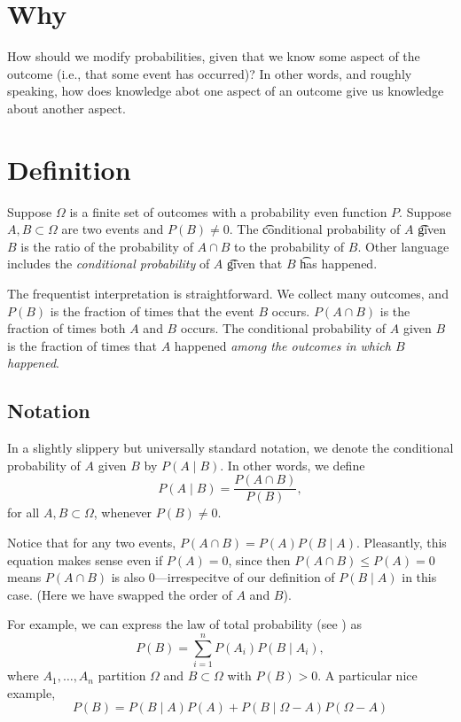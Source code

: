 
\section*{Why}

How should we modify probabilities, given that we know some aspect of the outcome (i.e., that some event has occurred)?
In other words, and roughly speaking, how does knowledge abot one aspect of an outcome give us knowledge about another aspect.

\section*{Definition}

Suppose $\Omega $ is a finite set of outcomes with a probability even function $P$.
Suppose $A, B \subset \Omega $ are two events and $P(B) \neq 0$.
The \t{conditional probability} of $A$ \t{given} $B$ is the ratio of the probability of $A \cap  B$ to the probability of $B$.
Other language includes the \textit{conditional probability} of $A$ \t{given that} $B$ \t{has happened}.

The frequentist interpretation is straightforward.
We collect many outcomes, and $P(B)$ is the fraction of times that the event $B$ occurs.
$P(A \cap  B)$ is the fraction of times both $A$ and $B$ occurs.
The conditional probability of $A$ given $B$ is the fraction of times that $A$ happened \textit{among the outcomes in which $B$ happened}.

\subsection*{Notation}

In a slightly slippery but universally standard notation, we denote the conditional probability of $A$ given $B$ by $P(A \mid  B)$.
In other words, we define
\[
P(A \mid  B) = \frac{P(A \cap  B)}{P(B)},
\]
for all $A, B \subset \Omega $, whenever $P(B) \neq 0$.

Notice that for any two events, $P(A \cap  B) = P(A) P(B\mid A)$.
Pleasantly, this equation makes sense even if $P(A) = 0$, since then $P(A \cap  B) \leq P(A) = 0$ means $P(A \cap  B)$ is also 0---irrespecitve of our definition of $P(B \mid  A)$ in this case.
(Here we have swapped the order of $A$ and $B$).

For example, we can express the law of total probability (see ) as
\[
\textstyle
P(B) = \sum_{i = 1}^{n} P(A_i)P(B \mid  A_i),
\]
where $A_1, \dots , A_n$ partition $\Omega $ and $B \subset \Omega $ with $P(B) > 0$.
A particular nice example,
\[
P(B) = P(B \mid  A)P(A) + P(B \mid  \Omega  - A)P(\Omega  - A)
\]


